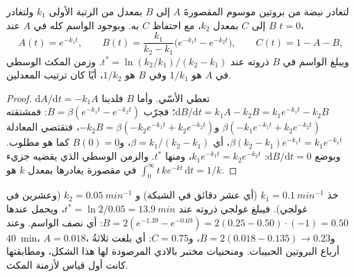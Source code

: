 \begin{theorem}\label{thm:b3:membrane-traffic:pulse-chase}
لتغادر نبضة من بروتين موسوم المقصورةَ $A$ إلى $B$ بمعدل
من الرتبة الأولى $k_{1}$ ولتغادر $B$ إلى $C$ بمعدل $k_{2}$، مع احتفاظ
$C$ به. وبوجود الواسم كله في $A$ عند $t = 0$،
\[
A(t) = e^{-k_{1}t},\qquad
B(t) = \frac{k_{1}}{k_{2} - k_{1}}\bigl(e^{-k_{1}t} - e^{-k_{2}t}\bigr),
\qquad
C(t) = 1 - A - B,
\]
ويبلغ الواسم في $B$ ذروته عند $t^{*} = \ln(k_{2}/k_{1})/(k_{2} - k_{1})$.
وزمن المكث الوسطي في $A$ هو $1/k_{1}$ وفي $B$ هو $1/k_{2}$،
أيًا كان ترتيب المعدلين.
\end{theorem}
\begin{proof}
$\mathrm{d}A/\mathrm{d}t = -k_{1}A$ تعطي الأسّي. وأما $B$ فلدينا
$\mathrm{d}B/\mathrm{d}t = k_{1}A - k_{2}B = k_{1}e^{-k_{1}t} - k_{2}B$؛
فجرّب $B = \beta(e^{-k_{1}t} - e^{-k_{2}t})$: فمشتقته
$\beta(-k_{1}e^{-k_{1}t} + k_{2}e^{-k_{2}t})$ و$-k_{2}B = \beta(-k_{2}
e^{-k_{1}t} + k_{2}e^{-k_{2}t})$، فتقتضي المعادلة $\beta(k_{2}
- k_{1})e^{-k_{1}t} = k_{1}e^{-k_{1}t}$، أي $\beta = k_{1}/(k_{2} -
k_{1})$، و$B(0) = 0$ كما هو مطلوب. وبوضع $\mathrm{d}B/\mathrm{d}t =
0$: $k_{1}e^{-k_{1}t} = k_{2}e^{-k_{2}t}$، ومنها $t^{*}$. والزمن الوسطي
الذي يقضيه جزيء في مقصورة يغادرها بمعدل $k$ هو $\int_{0}^{
\infty} t\,k e^{-kt}\,\mathrm{d}t = 1/k$.
\end{proof}

\begin{example}\label{ex:b3:membrane-traffic:palade}
خذ $k_{1} = \qty{0.1}{min^{-1}}$ (أي عشر دقائق في الشبكة) و
$k_{2} = \qty{0.05}{min^{-1}}$ (وعشرين في غولجي). فيبلغ غولجي ذروته عند
$t^{*} = \ln 2/0.05 = \qty{13.9}{min}$، ويحمل عندها $B = 2(e^{-1.39} -
e^{-0.69}) = 2(0.25 - 0.50)\cdot(-1) = 0.50$: أي نصف الواسم. وعند
\qty{40}{min}، $A = 0.018$، و$B = 2(0.018 - 0.135) \to 0.23$، و$C = 0.75$:
أي بلغت ثلاثةُ أرباع البروتين الحبيبات. ومنحنيات
مختبر بالادي المرصودة لها هذا الشكل، ومطابقتها كانت
أول قياس لأزمنة المكث.
\end{example}

